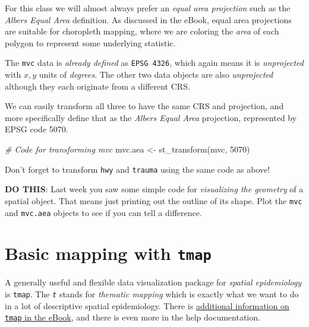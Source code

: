 \documentclass[
]{book}
\newenvironment{Shaded}{\begin{snugshade}}{\end{snugshade}}
\newcommand{\CommentTok}[1]{\textcolor[rgb]{0.56,0.35,0.01}{\textit{#1}}}
\newcommand{\DecValTok}[1]{\textcolor[rgb]{0.00,0.00,0.81}{#1}}
\newcommand{\FunctionTok}[1]{\textcolor[rgb]{0.00,0.00,0.00}{#1}}
\newcommand{\NormalTok}[1]{#1}
\newcommand{\OtherTok}[1]{\textcolor[rgb]{0.56,0.35,0.01}{#1}}
\newenvironment{rmdnote}[1]
  {
  \begin{itemize}
  \renewcommand{\labelitemi}{
    \raisebox{-.7\height}[0pt][0pt]{
      {\setkeys{Gin}{width=3em,keepaspectratio}\texttt{[image: images/\#1]}}
    }
  }
  \setlength{\fboxsep}{1em}
  \begin{note}
  \item
  }
  {
  \end{note}
  \end{itemize}
  }
\begin{document}
For this class we will almost always prefer an \emph{equal area projection} such as the \emph{Albers Equal Area} definition. As discussed in the eBook, equal area projections are suitable for choropleth mapping, where we are coloring the \emph{area} of each polygon to represent some underlying statistic.

The \texttt{mvc} data is \emph{already defined} as \texttt{EPSG\ 4326}, which again means it is \emph{unprojected} with \(x,y\) units of \emph{degrees}. The other two data objects are also \emph{unprojected} although they each originate from a different CRS.

We can easily transform all three to have the same CRS and projection, and more specifically define that as the \emph{Albers Equal Area} projection, represented by EPSG code 5070.

\begin{Shaded}
\begin{Highlighting}[]
\CommentTok{\# Code for transforming mvc}
\NormalTok{mvc.aea }\OtherTok{\textless{}{-}} \FunctionTok{st\_transform}\NormalTok{(mvc, }\DecValTok{5070}\NormalTok{)}
\end{Highlighting}
\end{Shaded}

Don't forget to transform \texttt{hwy} and \texttt{trauma} using the same code as above!

\begin{rmdnote}{note}
\textbf{DO THIS}: Last week you saw some simple code for \emph{visualizing the geometry} of a spatial object. That means just printing out the outline of its shape. Plot the \texttt{mvc} and \texttt{mvc.aea} objects to see if you can tell a difference.

\end{rmdnote}

\hypertarget{basic-mapping-with-tmap}{%
\section{\texorpdfstring{Basic mapping with \texttt{tmap}}{Basic mapping with tmap}}\label{basic-mapping-with-tmap}}

A generally useful and flexible data visualization package for \emph{spatial epidemiology} is \texttt{tmap}. The \emph{\texttt{t}} stands for \emph{thematic mapping} which is exactly what we want to do in a lot of descriptive spatial epidemiology. There is \href{https://mkram01.github.io/EPI563-SpatialEPI/intro-tmap.html}{additional information on \texttt{tmap} in the eBook}, and there is even more in the help documentation.
\end{document}
